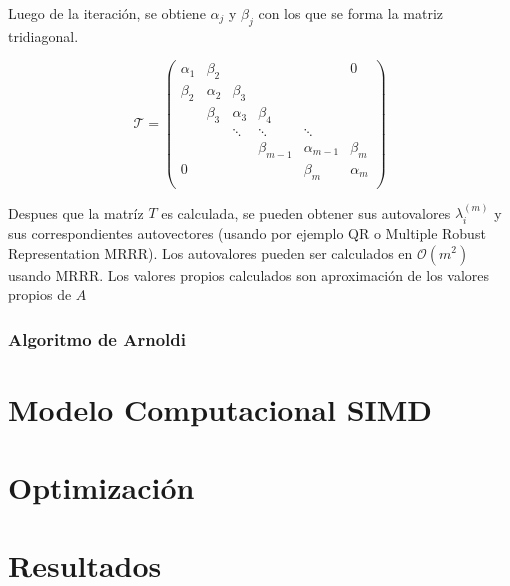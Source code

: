 \documentclass[a4paper,openright,12pt, oneside]{book}
\DeclareRobustCommand{\orderof}{\ensuremath{\mathcal{O}}}
\begin{document}
Luego de la iteraci\'on, se obtiene $\alpha_j$ y $\beta_j$ con los que se forma la matriz tridiagonal.

\begin{equation}
\mathcal{T} =
\left(
\begin{array}{cccccc}
\alpha_1 & \beta_2& & & & 0\\
\beta_2&   \alpha_2& \beta_3& & &  \\
&   \beta_3& \alpha_3& \beta_4& &  \\
&   & \ddots& \ddots& \ddots&  \\
&   & & \beta_{m-1}& \alpha_{m-1}& \beta_{m} \\
0&   & & & \beta_{m}& \alpha_{m} \\
\end{array}
\right)
\end{equation}

Despues que la matr\'iz $\displaystyle T$ es calculada, se pueden obtener sus autovalores $\lambda_i^{(m)}$ y sus correspondientes autovectores (usando por ejemplo QR o Multiple Robust Representation MRRR).
Los autovalores pueden ser calculados en $\orderof(m^2)$ usando MRRR.
Los valores propios calculados son aproximaci\'on de los valores propios de $\displaystyle A$

\subsection{Algoritmo de Arnoldi}



\setcounter{chapter}{3}
\setcounter{section}{0}
\chapter*{Modelo Computacional SIMD}\label{Modelo Computacional SIMD}
\markboth{}{} %


\setcounter{chapter}{4}
\setcounter{section}{0}
\chapter*{Optimizaci\'on}\label{Optimizacion}
\markboth{}{} %



\setcounter{chapter}{5}
\setcounter{section}{0}
\chapter*{Resultados}\label{Resultados}
\markboth{}{} %
\end{document}
